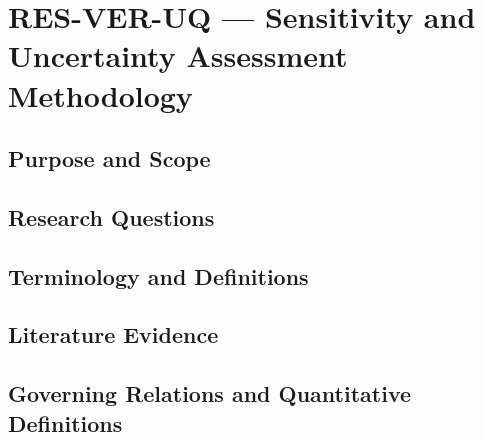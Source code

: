 
\section{RES-VER-UQ --- Sensitivity and Uncertainty Assessment Methodology}
\label{sec:res-ver-uq}

\subsection{Purpose and Scope}
\label{sec:res-ver-uq-purpose}


\subsection{Research Questions}
\label{sec:res-ver-uq-research-questions}


\subsection{Terminology and Definitions}
\label{sec:res-ver-uq-definitions}


\subsection{Literature Evidence}
\label{sec:res-ver-uq-literature-evidence}

%

\subsection{Governing Relations and Quantitative Definitions}
\label{sec:res-ver-uq-governing-relations}

